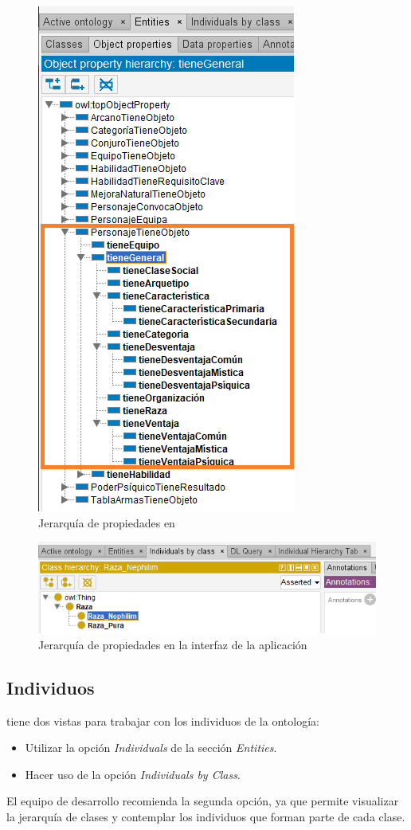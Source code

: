 \begin{figure}[H]
    \centering
    \includegraphics[scale=0.6]{Figures/Protege/Jerarquia_1.png}
    \caption{Jerarquía de propiedades en \protege}
    \label{Jerarquia_1}
\end{figure}

\begin{figure}[H]
    \centering
    \includegraphics[scale=0.6]{Figures/Protege/CreateIndividual_1.png}
    \caption{Jerarquía de propiedades en la interfaz de la aplicación}
    \label{Jerarquia_2}
\end{figure}

\subsection{Individuos}
\protege tiene dos vistas para trabajar con los individuos de la ontología:
\begin{itemize}
    \item Utilizar la opción \textit{Individuals} de la sección \textit{Entities}.
    \item Hacer uso de la opción \textit{Individuals by Class}.
\end{itemize}
El equipo de desarrollo recomienda la segunda opción, ya que permite visualizar la jerarquía de clases y 
contemplar los individuos que forman parte de cada clase.

